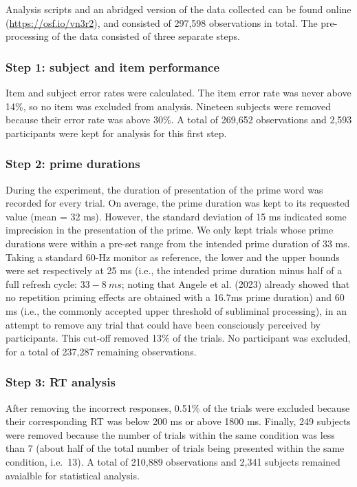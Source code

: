 \documentclass[
]{interact}
\begin{document}
Analysis scripts and an abridged version of the data collected can be
found online (\url{https://osf.io/vn3r2}), and consisted of 297,598
observations in total. The pre-processing of the data consisted of three
separate steps.

\subsubsection{Step 1: subject and item
performance}\label{sec-exp1-analysis-performance}

Item and subject error rates were calculated. The item error rate was
never above 14\%, so no item was excluded from analysis. Nineteen
subjects were removed because their error rate was above 30\%. A total
of 269,652 observations and 2,593 participants were kept for analysis
for this first step.

\subsubsection{Step 2: prime
durations}\label{sec-exp1-analysis-primeTime}

During the experiment, the duration of presentation of the prime word
was recorded for every trial. On average, the prime duration was kept to
its requested value (mean = 32 ms). However, the standard deviation of
15 ms indicated some imprecision in the presentation of the prime. We
only kept trials whose prime durations were within a pre-set range from
the intended prime duration of 33 ms. Taking a standard 60-Hz monitor as
reference, the lower and the upper bounds were set respectively at 25 ms
(i.e., the intended prime duration minus half of a full refresh cycle:
\(33-8~ ms\); noting that Angele et al. (2023) already showed that no
repetition priming effects are obtained with a 16.7ms prime duration)
and 60 ms (i.e., the commonly accepted upper threshold of subliminal
processing), in an attempt to remove any trial that could have been
consciously perceived by participants. This cut-off removed 13\% of the
trials. No participant was excluded, for a total of 237,287 remaining
observations.

\subsubsection{Step 3: RT analysis}\label{sec-exp1-analysis-RT}

After removing the incorrect responses, 0.51\% of the trials were
excluded because their corresponding RT was below 200 ms or above 1800
ms. Finally, 249 subjects were removed because the number of trials
within the same condition was less than 7 (about half of the total
number of trials being presented within the same condition, i.e.~13). A
total of 210,889 observations and 2,341 subjects remained avaialble for
statistical analysis.
\end{document}
